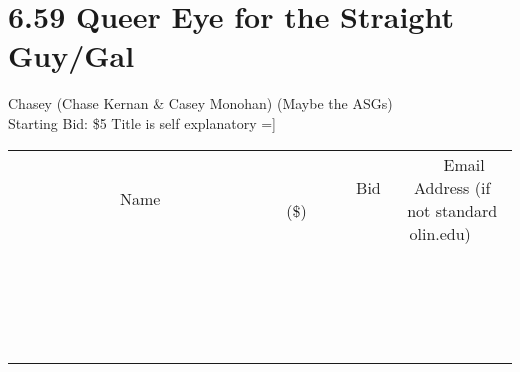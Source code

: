 \documentclass[11pt]{article}
\begin{document}
\section*{6.59 Queer Eye for the Straight Guy/Gal}
Chasey (Chase Kernan  \& Casey Monohan) (Maybe the ASGs)
\\
Starting Bid: \$5
\newline
Title is self explanatory =]
\\[3ex]
\begin{tabular}{c c c}
~~~~~~~~~~~~~Name~~~~~~~~~~~~~ & ~~~~~~~~~Bid (\$)~~~~~~~~~  & ~~~Email Address (if not standard olin.edu)~~~\\
 & & \\
\hline
 & & \\
\hline
 & & \\
\hline
 & & \\
\hline
 & & \\
\hline
 & & \\
\hline
 & & \\
\hline
 & & \\
\hline
 & & \\
\hline
 & & \\
\hline
 & & \\
\hline
 & & \\
\hline
 & & \\
\hline
 & & \\
\hline
 & & \\
\hline
 & & \\
\hline
 & & \\
\hline
 & & \\
\hline
 & & \\
\hline
\end{tabular}
\newpage
\end{document}
